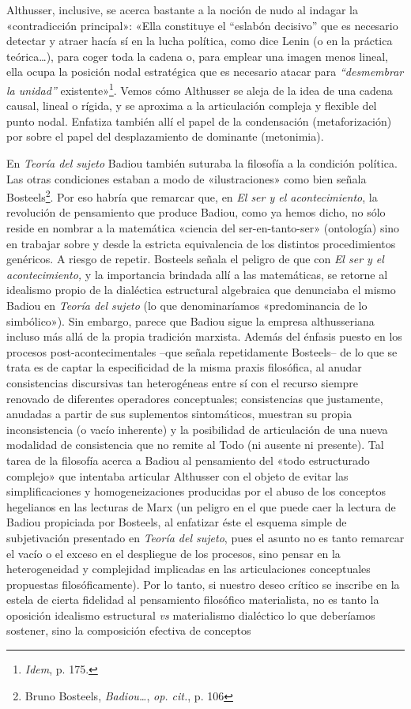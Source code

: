 Althusser, inclusive, se acerca bastante a la noción de nudo al indagar la «contradicción principal»: «Ella constituye el ``eslabón decisivo'' que es necesario detectar y atraer hacía sí en la lucha política, como dice Lenin (o en la práctica teórica\ldots), para coger toda la cadena o, para emplear una imagen menos lineal, ella ocupa la posición nodal estratégica que es necesario atacar para \emph{``desmembrar la unidad''} existente»\footnote{\emph{Idem}, p. 175.}. Vemos cómo Althusser se aleja de la idea de una cadena causal, lineal o rígida, y se aproxima a la articulación compleja y flexible del punto nodal. Enfatiza también allí el papel de la condensación (metaforización) por sobre el papel del desplazamiento de dominante (metonimia).

En \emph{Teoría del sujeto} Badiou también suturaba la filosofía a la condición política. Las otras condiciones estaban a modo de «ilustraciones» como bien señala Bosteels\footnote{Bruno Bosteels, \emph{Badiou\ldots{}}, \emph{op. cit.}, p. 106}. Por eso habría que remarcar que, en \emph{El ser y el acontecimiento}, la revolución de pensamiento que produce Badiou, como ya hemos dicho, no sólo reside en nombrar a la matemática «ciencia del ser-en-tanto-ser» (ontología) sino en trabajar sobre y desde la estricta equivalencia de los distintos procedimientos genéricos. A riesgo de repetir. Bosteels señala el peligro de que con \emph{El ser y el acontecimiento,} y la importancia brindada allí a las matemáticas, se retorne al idealismo propio de la dialéctica estructural algebraica que denunciaba el mismo Badiou en \emph{Teoría del sujeto} (lo que denominaríamos «predominancia de lo simbólico»). Sin embargo, parece que Badiou sigue la empresa althusseriana incluso más allá de la propia tradición marxista. Además del énfasis puesto en los procesos post-acontecimentales --que señala repetidamente Bosteels-- de lo que se trata es de captar la especificidad de la misma praxis filosófica, al anudar consistencias discursivas tan heterogéneas entre sí con el recurso siempre renovado de diferentes operadores conceptuales; consistencias que justamente, anudadas a partir de sus suplementos sintomáticos, muestran su propia inconsistencia (o vacío inherente) y la posibilidad de articulación de una nueva modalidad de consistencia que no remite al Todo (ni ausente ni presente). Tal tarea de la filosofía acerca a Badiou al pensamiento del «todo estructurado complejo» que intentaba articular Althusser con el objeto de evitar las simplificaciones y homogeneizaciones producidas por el abuso de los conceptos hegelianos en las lecturas de Marx (un peligro en el que puede caer la lectura de Badiou propiciada por Bosteels, al enfatizar éste el esquema simple de subjetivación presentado en \emph{Teoría del sujeto}, pues el asunto no es tanto remarcar el vacío o el exceso en el despliegue de los procesos, sino pensar en la heterogeneidad y complejidad implicadas en las articulaciones conceptuales propuestas filosóficamente). Por lo tanto, si nuestro deseo crítico se inscribe en la estela de cierta fidelidad al pensamiento filosófico materialista, no es tanto la oposición idealismo estructural \emph{vs} materialismo dialéctico lo que deberíamos sostener, sino la composición efectiva de conceptos 